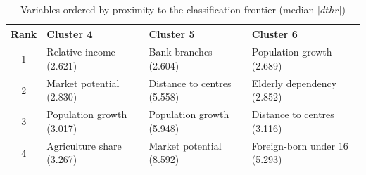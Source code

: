 \documentclass[a4paper,11pt,oneside]{article}
\begin{document}
\begin{table}[ht]
\centering
\footnotesize
\caption{Variables ordered by proximity to the classification frontier (median $|dthr|$)}
\label{tab:frontier_order}
\begin{tabular}{c p{4.2cm} p{4.2cm} p{4.2cm}}
\toprule
\textbf{Rank} & \textbf{Cluster 4} & \textbf{Cluster 5} & \textbf{Cluster 6} \\
\midrule
1  & Relative income (2.621)              & Bank branches (2.604)             & Population growth (2.689) \\
2  & Market potential (2.830)             & Distance to centres (5.558)       & Elderly dependency (2.852) \\
3  & Population growth (3.017)            & Population growth (5.948)         & Distance to centres (3.116) \\
4  & Agriculture share (3.267)            & Market potential (8.592)          & Foreign-born under 16 (5.293) \\

\bottomrule
\end{tabular}
\end{table}
\end{document}
